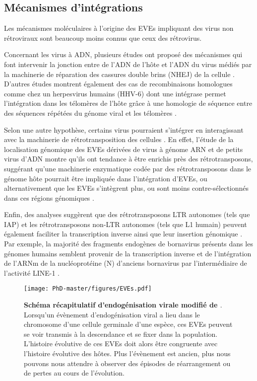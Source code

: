 \subsection{Mécanismes d'intégrations}

Les mécanismes moléculaires à l'origine des EVEs impliquant des virus non rétroviraux sont beaucoup moins connus que ceux des rétrovirus. 

Concernant les virus à ADN, plusieurs études ont proposé des mécanismes qui font intervenir la jonction entre de l'ADN de l'hôte et l'ADN du virus médiés par la machinerie de réparation des cassures double brins (NHEJ) de la cellule \citep{gilbert_genomic_2010, geering_endogenous_2014}. D'autres études montrent également des cas de recombinaisons homologues comme chez un herpesvirus humains (HHV-6) dont une intégrase permet l'intégration dans les télomères de l'hôte grâce à une homologie de séquence entre des séquences répétées du génome viral et les télomères \citep{arbuckle_latent_2010,osterrieder_herpesvirus_2014}.  

Selon une autre hypothèse, certains virus pourraient s'intégrer en interagissant avec la machinerie de rétrotransposition des cellules \citep{katzourakis_endogenous_2010}. En effet, l'étude de la localisation génomique des EVEs dérivées de virus à génome ARN et de petits virus d'ADN montre qu'ils ont tendance à être enrichis près des rétrotransposons, suggérant qu'une machinerie enzymatique codée par des rétrotransposons dans le génome hôte pourrait être impliquée dans l'intégration d'EVEs, ou alternativement que les EVEs s'intègrent plus, ou sont moins contre-sélectionnés dans ces régions génomiques \citep{katzourakis_endogenous_2010,gilbert_diversity_2022,suzuki_non-retroviral_2020}. 

Enfin, des analyses suggèrent que des rétrotransposons LTR autonomes (tels que IAP) et les rétrotransposons non-LTR autonomes (tels que L1 humain) peuvent également faciliter la transcription inverse ainsi que leur insertion génomique  \citep{geuking_recombination_2009}. Par exemple, la majorité des fragments endogènes de bornavirus présents dans les génomes humains semblent provenir de la transcription inverse et de l'intégration de l'ARNm de la nucléoprotéine (N) d'anciens bornavirus par l'intermédiaire de l'activité LINE-1 \citep{horie_endogenous_2010}.
\newpage

\begin{figure}[!htpb]
\captionsetup{font=footnotesize}
 \centering
  \texttt{[image: PhD-master/figures/EVEs.pdf]}
\caption[Intro:Schéma récapitulatif d'endogénisation virale]{\textbf{Schéma récapitulatif d'endogénisation virale modifié de \cite{katzourakis_endogenous_2010}}. Lorsqu'un évènement d'endogénisation viral a lieu dans le chromosome d'une cellule germinale d'une espèce, ces EVEs peuvent se voir transmis à la descendance et se fixer dans la population. L'histoire évolutive de ces EVEs doit alors être congruente avec l'histoire évolutive des hôtes. Plus l'évènement est ancien, plus nous pouvons nous attendre à observer des épisodes de réarrangement ou de pertes au cours de l'évolution.}
\label{figure:EVE}
\end{figure}



